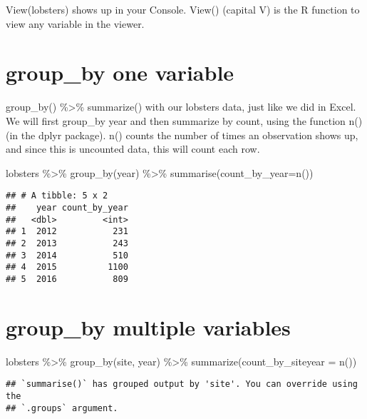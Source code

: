 \documentclass[
]{article}
\newenvironment{Shaded}{\begin{snugshade}}{\end{snugshade}}
\newcommand{\AttributeTok}[1]{\textcolor[rgb]{0.77,0.63,0.00}{#1}}
\newcommand{\FunctionTok}[1]{\textcolor[rgb]{0.00,0.00,0.00}{#1}}
\newcommand{\NormalTok}[1]{#1}
\newcommand{\SpecialCharTok}[1]{\textcolor[rgb]{0.00,0.00,0.00}{#1}}
\begin{document}
View(lobsters) shows up in your Console. View() (capital V) is the R
function to view any variable in the viewer.

\hypertarget{group_by-one-variable}{%
\section{group\_by one variable}\label{group_by-one-variable}}

group\_by() \%\textgreater\% summarize() with our lobsters data, just
like we did in Excel. We will first group\_by year and then summarize by
count, using the function n() (in the dplyr package). n() counts the
number of times an observation shows up, and since this is uncounted
data, this will count each row.

\begin{Shaded}
\begin{Highlighting}[]
\NormalTok{lobsters }\SpecialCharTok{\%\textgreater{}\%}
\FunctionTok{group\_by}\NormalTok{(year) }\SpecialCharTok{\%\textgreater{}\%}
  \FunctionTok{summarise}\NormalTok{(}\AttributeTok{count\_by\_year=}\FunctionTok{n}\NormalTok{())}
\end{Highlighting}
\end{Shaded}

\begin{verbatim}
## # A tibble: 5 x 2
##    year count_by_year
##   <dbl>         <int>
## 1  2012           231
## 2  2013           243
## 3  2014           510
## 4  2015          1100
## 5  2016           809
\end{verbatim}

\hypertarget{group_by-multiple-variables}{%
\section{group\_by multiple
variables}\label{group_by-multiple-variables}}

\begin{Shaded}
\begin{Highlighting}[]
\NormalTok{lobsters }\SpecialCharTok{\%\textgreater{}\%}
  \FunctionTok{group\_by}\NormalTok{(site, year) }\SpecialCharTok{\%\textgreater{}\%}
  \FunctionTok{summarize}\NormalTok{(}\AttributeTok{count\_by\_siteyear =}  \FunctionTok{n}\NormalTok{())}
\end{Highlighting}
\end{Shaded}

\begin{verbatim}
## `summarise()` has grouped output by 'site'. You can override using the
## `.groups` argument.
\end{verbatim}
\end{document}
